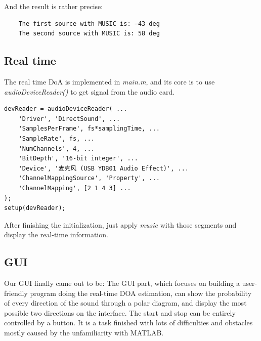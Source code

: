 \documentclass[UTF8]{article}
\begin{document}
\begin{figure}[H]
    \centering
    \hspace{0.4in}
\end{figure}

And the result is rather precise:
\begin{lstlisting}
    The first source with MUSIC is: −43 deg
    The second source with MUSIC is: 58 deg
\end{lstlisting}

\subsection{Real time}
The real time DoA is implemented in \emph{main.m}, and its core is to use \emph{audioDeviceReader()} to get signal from the audio card.

\begin{lstlisting}
devReader = audioDeviceReader( ...
    'Driver', 'DirectSound', ...
    'SamplesPerFrame', fs*samplingTime, ...
    'SampleRate', fs, ...
    'NumChannels', 4, ...
    'BitDepth', '16-bit integer', ...
    'Device', '麦克风 (USB YDB01 Audio Effect)', ...
    'ChannelMappingSource', 'Property', ...
    'ChannelMapping', [2 1 4 3] ...
);
setup(devReader);
\end{lstlisting}
After finishing the initialization, just apply \emph{music} with those segments and display the real-time information.

\subsection{GUI}

\hspace{0.5em} Our GUI finally came out to be:
The GUI part, which focuses on building a user-friendly program doing
the real-time DOA estimation, can show the probability of every
direction of the sound through a polar diagram, and display the most
possible two directions on the interface. The start and stop can be
entirely controlled by a button. It is a task finished with lots of
difficulties and obstacles mostly caused by the unfamiliarity with
MATLAB.
\end{document}
